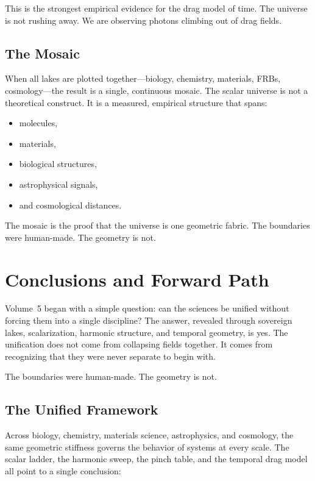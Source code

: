 \documentclass[11pt, letterpaper, openany]{book}
\begin{document}
This is the strongest empirical evidence for the drag model of time.  
The universe is not rushing away.  
We are observing photons climbing out of drag fields.

\section*{The Mosaic}
When all lakes are plotted together—biology, chemistry, materials, FRBs, cosmology—the result is a
single, continuous mosaic. The scalar universe is not a theoretical construct. It is a measured,
empirical structure that spans:

\begin{itemize}
    \item molecules,
    \item materials,
    \item biological structures,
    \item astrophysical signals,
    \item and cosmological distances.
\end{itemize}

The mosaic is the proof that the universe is one geometric fabric.  
The boundaries were human-made.  
The geometry is not.

\chapter{Conclusions and Forward Path}

Volume~5 began with a simple question: can the sciences be unified without forcing them into a
single discipline? The answer, revealed through sovereign lakes, scalarization, harmonic structure,
and temporal geometry, is yes. The unification does not come from collapsing fields together. It
comes from recognizing that they were never separate to begin with.

The boundaries were human-made.  
The geometry is not.

\section*{The Unified Framework}
Across biology, chemistry, materials science, astrophysics, and cosmology, the same geometric
stiffness governs the behavior of systems at every scale. The scalar ladder, the harmonic sweep, the
pinch table, and the temporal drag model all point to a single conclusion:
\end{document}
